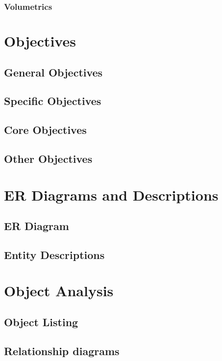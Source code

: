 \documentclass[12pt]{report}
\begin{document}
\subsubsection{Volumetrics}

\section{Objectives}

\subsection{General Objectives}

\subsection{Specific Objectives}

\subsection{Core Objectives}

\subsection{Other Objectives}

\section{ER Diagrams and Descriptions}

\subsection{ER Diagram}

\subsection{Entity Descriptions}

\section{Object Analysis}

\subsection{Object Listing}

\subsection{Relationship diagrams}
\end{document}
